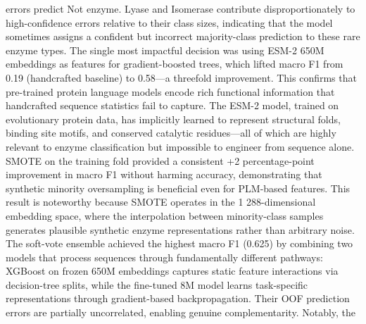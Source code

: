 {}errors predict Not enzyme. Lyase and Isomerase contribute disproportionately to\markdownRendererSoftLineBreak
{}high-confidence errors relative to their class sizes, indicating that the model sometimes\markdownRendererSoftLineBreak
{}assigns a confident but incorrect majority-class prediction to these rare enzyme types.\markdownRendererInterblockSeparator
{}
\markdownRendererSectionEnd \markdownRendererSectionBegin
{}\markdownRendererInterblockSeparator
{}\markdownRendererSectionBegin
{}\markdownRendererInterblockSeparator
{}The single most impactful decision was using ESM-2 650M embeddings as features for\markdownRendererSoftLineBreak
{}gradient-boosted trees, which lifted macro F1 from 0.19 (handcrafted baseline) to 0.58—a\markdownRendererSoftLineBreak
{}threefold improvement. This confirms that pre-trained protein language models encode rich\markdownRendererSoftLineBreak
{}functional information that handcrafted sequence statistics fail to capture. The ESM-2 model,\markdownRendererSoftLineBreak
{}trained on evolutionary protein data, has implicitly learned to represent structural folds,\markdownRendererSoftLineBreak
{}binding site motifs, and conserved catalytic residues—all of which are highly relevant to\markdownRendererSoftLineBreak
{}enzyme classification but impossible to engineer from sequence alone.\markdownRendererParagraphSeparator
{}SMOTE on the training fold provided a consistent +2 percentage-point improvement in macro F1\markdownRendererSoftLineBreak
{}without harming accuracy, demonstrating that synthetic minority oversampling is beneficial\markdownRendererSoftLineBreak
{}even for PLM-based features. This result is noteworthy because SMOTE operates in the\markdownRendererSoftLineBreak
{}1 288-dimensional embedding space, where the interpolation between minority-class samples\markdownRendererSoftLineBreak
{}generates plausible synthetic enzyme representations rather than arbitrary noise.\markdownRendererParagraphSeparator
{}The soft-vote ensemble achieved the highest macro F1 (0.625) by combining two models that\markdownRendererSoftLineBreak
{}process sequences through fundamentally different pathways: XGBoost on frozen 650M embeddings\markdownRendererSoftLineBreak
{}captures static feature interactions via decision-tree splits, while the fine-tuned 8M model\markdownRendererSoftLineBreak
{}learns task-specific representations through gradient-based backpropagation. Their OOF\markdownRendererSoftLineBreak
{}prediction errors are partially uncorrelated, enabling genuine complementarity. Notably, the\markdownRendererSoftLineBreak
